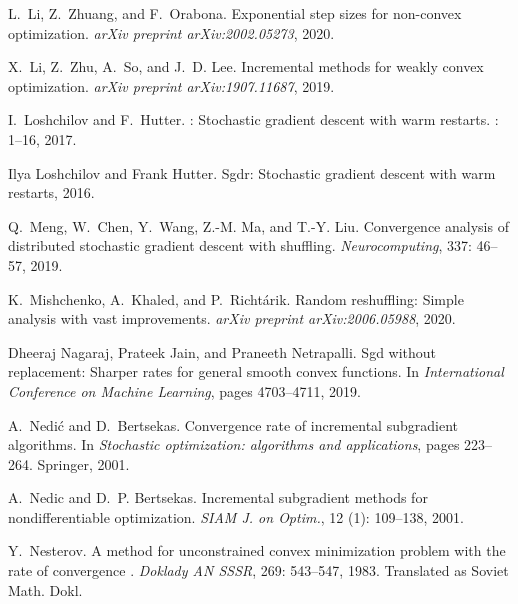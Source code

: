 \begin{thebibliography}{42}
L.~Li, Z.~Zhuang, and F.~Orabona.
\newblock Exponential step sizes for non-convex optimization.
\newblock \emph{arXiv preprint arXiv:2002.05273}, 2020.

X.~Li, Z.~Zhu, A.~So, and J.~D. Lee.
\newblock Incremental methods for weakly convex optimization.
\newblock \emph{arXiv preprint arXiv:1907.11687}, 2019.

I.~Loshchilov and F.~Hutter.
: {S}tochastic gradient descent with warm restarts.
: 1--16, 2017.

Ilya Loshchilov and Frank Hutter.
\newblock Sgdr: Stochastic gradient descent with warm restarts, 2016.

Q.~Meng, W.~Chen, Y.~Wang, Z.-M. Ma, and T.-Y. Liu.
\newblock Convergence analysis of distributed stochastic gradient descent with
  shuffling.
\newblock \emph{Neurocomputing}, 337: 46--57, 2019.

K.~Mishchenko, A.~Khaled, and P.~Richt{\'a}rik.
\newblock Random reshuffling: {S}imple analysis with vast improvements.
\newblock \emph{arXiv preprint arXiv:2006.05988}, 2020.

Dheeraj Nagaraj, Prateek Jain, and Praneeth Netrapalli.
\newblock Sgd without replacement: Sharper rates for general smooth convex
  functions.
\newblock In \emph{International Conference on Machine Learning}, pages
  4703--4711, 2019.

A.~Nedi{\'c} and D.~Bertsekas.
\newblock Convergence rate of incremental subgradient algorithms.
\newblock In \emph{Stochastic optimization: algorithms and applications}, pages
  223--264. Springer, 2001.

A.~Nedic and D.~P. Bertsekas.
\newblock Incremental subgradient methods for nondifferentiable optimization.
\newblock \emph{SIAM J. on Optim.}, 12 (1): 109--138, 2001.

Y.~Nesterov.
\newblock A method for unconstrained convex minimization problem with the rate
  of convergence .
\newblock \emph{Doklady AN SSSR}, 269: 543--547, 1983.
\newblock Translated as Soviet Math. Dokl.


\end{thebibliography}

